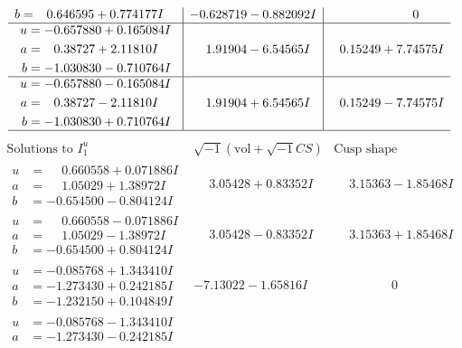 \documentclass[1p]{elsarticle_modified}
\theoremstyle{definition}
\newcommand{\I}{\sqrt{-1}}
\begin{document}
$$\begin{array}{c|c|c}
\begin{aligned}
b &= \phantom{-}0.646595 + 0.774177 I\end{aligned}
 & -0.628719 - 0.882092 I & \phantom{-0.000000 } 0 \\ \hline\begin{aligned}
u &= -0.657880 + 0.165084 I \\
a &= \phantom{-}0.38727 + 2.11810 I \\
b &= -1.030830 - 0.710764 I\end{aligned}
 & \phantom{-}1.91904 - 6.54565 I & \phantom{-}0.15249 + 7.74575 I \\ \hline\begin{aligned}
u &= -0.657880 - 0.165084 I \\
a &= \phantom{-}0.38727 - 2.11810 I \\
b &= -1.030830 + 0.710764 I\end{aligned}
 & \phantom{-}1.91904 + 6.54565 I & \phantom{-}0.15249 - 7.74575 I\\
 \hline 
 \end{array}$$\newpage$$\begin{array}{c|c|c}  
\text{Solutions to }I^u_{1}& \I (\text{vol} + \sqrt{-1}CS) & \text{Cusp shape}\\
 \hline 
\begin{aligned}
u &= \phantom{-}0.660558 + 0.071886 I \\
a &= \phantom{-}1.05029 + 1.38972 I \\
b &= -0.654500 - 0.804124 I\end{aligned}
 & \phantom{-}3.05428 + 0.83352 I & \phantom{-}3.15363 - 1.85468 I \\ \hline\begin{aligned}
u &= \phantom{-}0.660558 - 0.071886 I \\
a &= \phantom{-}1.05029 - 1.38972 I \\
b &= -0.654500 + 0.804124 I\end{aligned}
 & \phantom{-}3.05428 - 0.83352 I & \phantom{-}3.15363 + 1.85468 I \\ \hline\begin{aligned}
u &= -0.085768 + 1.343410 I \\
a &= -1.273430 + 0.242185 I \\
b &= -1.232150 + 0.104849 I\end{aligned}
 & -7.13022 - 1.65816 I & \phantom{-0.000000 } 0 \\ \hline\begin{aligned}
u &= -0.085768 - 1.343410 I \\
a &= -1.273430 - 0.242185 I \\

\end{aligned}
\end{array}$$
\end{document}
